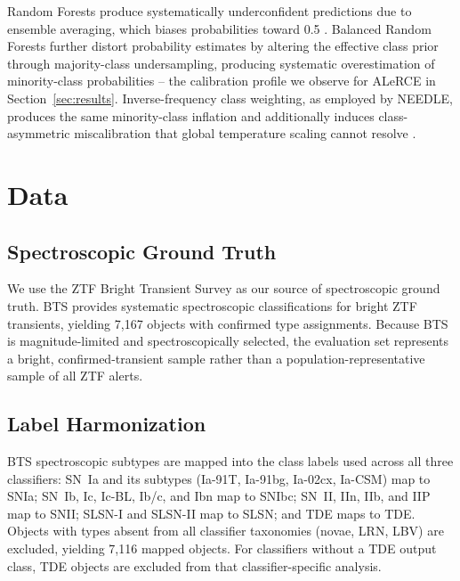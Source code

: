 \documentclass[twocolumn]{aastex631}
\begin{document}
Random Forests produce systematically underconfident predictions
due to ensemble averaging, which biases probabilities toward 0.5
\citep{niculescumizil2005, bostrom2008}. Balanced Random Forests
further distort probability estimates by altering the effective
class prior through majority-class undersampling, producing
systematic overestimation of minority-class probabilities
\citep{vandengoorbergh2022} -- the calibration profile we observe
for ALeRCE in Section~\ref{sec:results}. Inverse-frequency class
weighting, as employed by NEEDLE, produces the same minority-class
inflation and additionally induces class-asymmetric miscalibration
that global temperature scaling cannot resolve
\citep{vandengoorbergh2022, kull2019}.

\section{Data} \label{sec:data}

\subsection{Spectroscopic Ground Truth}\label{sec:groundtruth}

We use the ZTF Bright Transient Survey
\citep[BTS;][]{fremling2020, perley2020} as our source of
spectroscopic ground truth. BTS provides systematic spectroscopic
classifications for bright ZTF transients, yielding 7,167 objects
with confirmed type assignments. Because BTS is magnitude-limited
and spectroscopically selected, the evaluation set represents a
bright, confirmed-transient sample rather than a
population-representative sample of all ZTF alerts.

\subsection{Label Harmonization}\label{sec:labels}

BTS spectroscopic subtypes are mapped into the class labels used
across all three classifiers: SN~Ia and its subtypes (Ia-91T,
Ia-91bg, Ia-02cx, Ia-CSM) map to SNIa; SN~Ib, Ic, Ic-BL, Ib/c,
and Ibn map to SNIbc; SN~II, IIn, IIb, and IIP map to SNII;
SLSN-I and SLSN-II map to SLSN; and TDE maps to TDE. Objects
with types absent from all classifier taxonomies (novae, LRN, LBV)
are excluded, yielding 7,116 mapped objects. For classifiers
without a TDE output class, TDE objects are excluded from that
classifier-specific analysis.
\end{document}
